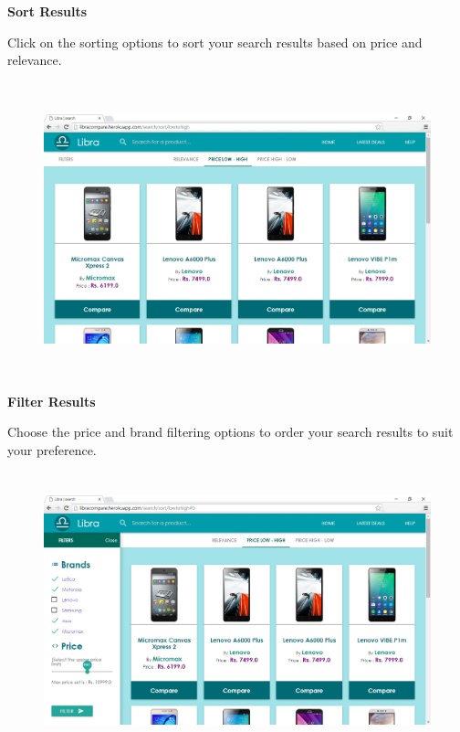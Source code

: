 \textbf{\large Sort Results}\\
\vspace{2mm}

Click on the sorting options to sort your search results based on price and relevance.

\vspace{1mm}

\begin{figure}[h!]
\centering
\includegraphics[width=13cm, height=8.5cm]{figure/sorting1.png}
\end{figure}

\newpage

\textbf{\large Filter Results}\\
\vspace{2mm}

Choose the price and brand filtering options to order your search results to suit your preference.

\vspace{1mm}

\begin{figure}[h!]
\centering
\includegraphics[width=13cm, height=8cm]{figure/filter1.png}
\end{figure}

